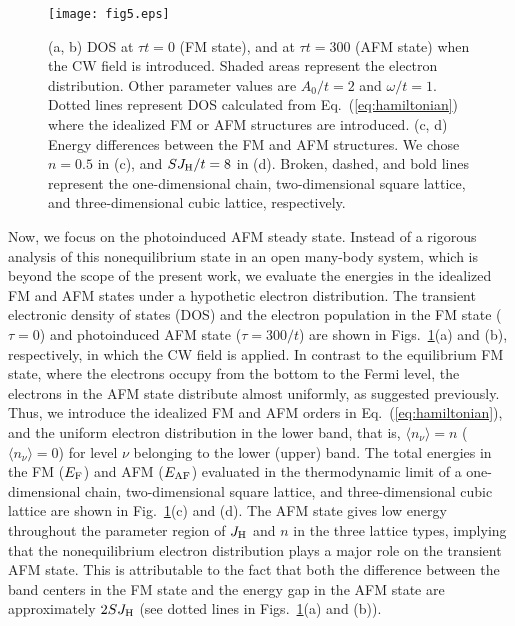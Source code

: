 \documentclass[aps,twocolumn,showpacs,prl,amsmath,amssymb]{revtex4-1}
\begin{document}
\begin{figure}[t]
\begin{center}
\texttt{[image: fig5.eps]}
\end{center}
\caption{
(a, b) DOS at $\tau t=0$ (FM state), and at $\tau t=300$ (AFM state) when the CW field is introduced. Shaded areas represent the electron distribution. 
Other parameter values are $A_0/t=2$ and $\omega/t=1$. 
Dotted lines represent DOS calculated from Eq.~(\ref{eq:hamiltonian}) where the idealized FM or AFM structures are introduced. 
%
(c, d) Energy differences between the FM and AFM structures. 
We chose $n=0.5$ in (c), and $SJ_{\rm H}/t=8$ in (d).  
Broken, dashed, and bold lines represent the one-dimensional chain, two-dimensional square lattice, and three-dimensional cubic lattice, respectively. 
}
\label{fig:fig5}
\end{figure}
Now, we focus on the photoinduced AFM steady state. 
Instead of a rigorous analysis of this nonequilibrium state in an open many-body system, which 
is beyond the scope of the present work, we evaluate the energies in the idealized FM and AFM states under a hypothetic electron distribution. 
%
The transient electronic density of states (DOS) and the electron population
in the FM state ($\tau =0$) and photoinduced AFM state ($\tau=300/t$) are shown in Figs.~\ref{fig:fig5}(a) and (b), respectively, in which the CW field is applied. 
%
In contrast to the equilibrium FM state, where the electrons occupy from the bottom to the Fermi level, 
the electrons in the AFM state distribute almost uniformly, as suggested previously. 
%
Thus, we introduce the idealized FM and AFM orders in Eq.~(\ref{eq:hamiltonian}), and the uniform electron distribution in the lower band, that is, $\langle n_\nu \rangle=n$ ($\langle n_\nu \rangle=0$) for level $\nu$ belonging to the lower (upper) band. 
%
The total energies in the FM ($E_{\rm F}$) and AFM ($E_{\rm AF}$) evaluated in the thermodynamic limit of a one-dimensional chain, two-dimensional square lattice, and three-dimensional cubic lattice are shown in Fig.~\ref{fig:fig5}(c) and (d). 
The AFM state gives low energy throughout the parameter region of $J_{\rm H}$ and $n$ in the three lattice types, implying that 
the nonequilibrium electron distribution plays a major role on the transient AFM state. 
%
This is attributable to the fact that both the difference between the band centers in the FM state 
and the energy gap in the AFM state are approximately $2SJ_{\rm H}$ 
(see dotted lines in Figs.~\ref{fig:fig5}(a) and (b)). 
\end{document}
